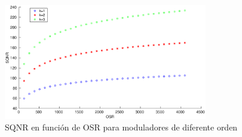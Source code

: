 \documentclass[a4paper,conference]{IEEEtran}
\begin{document}
\begin{figure}[!t]
\centering
\includegraphics[width=3.5in]{SQNR_ideal_segun_OSR}
%
\caption{SQNR en funci\'on de OSR para moduladores de diferente orden}
\label{fig:SQNR}
\end{figure}


%
%

\end{document}
